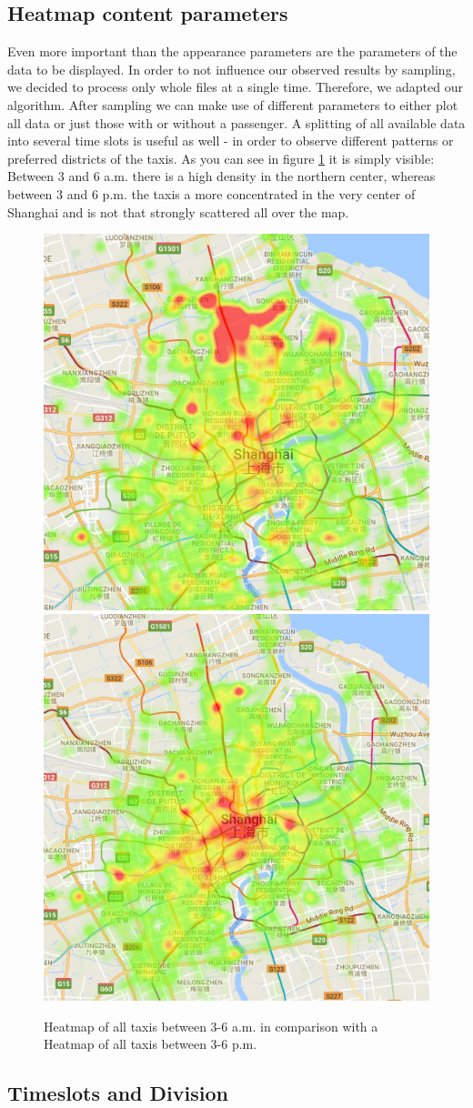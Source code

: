 \documentclass[11pt,conference,a4paper,twocolumns,romanappendices]{IEEEtran}
\begin{document}
\subsection{Heatmap content parameters}
Even more important than the appearance parameters are the parameters of the data to be displayed.
In order to not influence our observed results by sampling, we decided to process only whole files at a single time. Therefore, we adapted our algorithm.
After sampling we can make use of different parameters to either plot all data or just those with or without a passenger.
A splitting of all available data into several time slots is useful as well - in order to observe different patterns or preferred districts of the taxis.
As you can see in figure \ref{fig:allPass3to6} it is simply visible: Between 3 and 6 a.m. there is a high density in the northern center, whereas between 3 and 6 p.m. the taxis a more concentrated in the very center of Shanghai and is not that strongly scattered all over the map.

\begin{figure}
\begin{center}
\includegraphics[width=.3\textwidth]{3to6.png}
\includegraphics[width=.3\textwidth]{15to18.png}
\end{center}
\caption{\label{fig:allPass3to6}Heatmap of all taxis between 3-6 a.m. in comparison with a Heatmap of all taxis between 3-6 p.m.}
\end{figure}

\subsection{Timeslots and Division}
\end{document}
